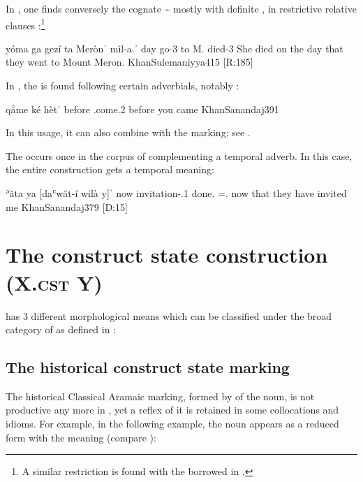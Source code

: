 In \JSul, one finds conversely the cognate \rel* {}\~ mostly with definite \prims, in restrictive relative clauses \citep[414]{KhanSulemaniyya}:\footnote{A similar restriction is found with the   borrowed in \NMand \citep[165]{HaberlMandaic}.}

{yóma ga\cb{} gezí ta\cb{} Merònˈ mìl-a.ˈ}
{day \rel\cb{} go-3\pl{} to\cb{} M. died-3\fem}
{She died on the day that they went to Mount Meron.}
{KhanSulemaniyya}{415 {[R:185]}}

In \JSan, the \rel* {} is found following certain adverbials, notably : 

{qắme ké hètˈ}
{before \rel{} \subj.come.2\masc}
{before you came}
{KhanSanandaj}{391}

In this usage, it can also combine with the \ez*  marking; see  .

The \rel* {} occurs once in the corpus of \citet{KhanSanandaj} complementing a temporal adverb. In this case, the entire construction gets a temporal meaning:

{ʾăta ya\cb{} [daʿwăt-í wilà \cb{}y]ˈ}
{now \rel\cb{} invitation-\poss.1\sg{} done.\resl{} =\cop.\masc}
{now that  they have invited me}
{KhanSanandaj}{379 {[D:15]}}
\antipar

  
\section{The construct state construction (X.\textsc{cst} Y)} \label{ss:JSan_cst}

\JSan has 3 different morphological means which can be classified under the broad category of  as defined in :

\subsection{The historical construct state marking}

The historical Classical Aramaic  marking, formed by  of the \prim noun, is not productive any more in \JSan, yet a reflex of it is retained  in some collocations and idioms. For example, in the following example, the noun  appears as a reduced form  with the meaning  (compare \Qar  {}):

